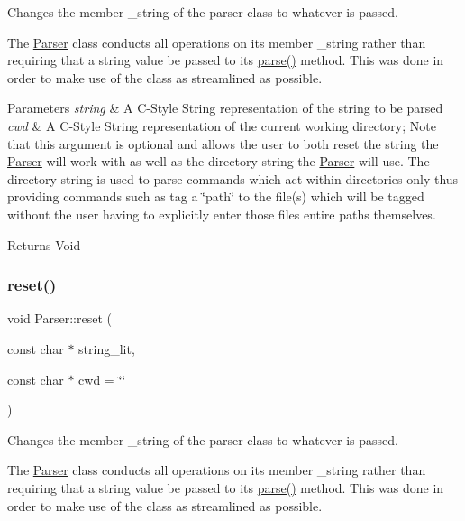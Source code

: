 Changes the member \+\_\+string of the parser class to whatever is passed. 

The \mbox{\hyperlink{class_parser}{Parser}} class conducts all operations on its member \+\_\+string rather than requiring that a string value be passed to its \mbox{\hyperlink{class_parser_a5b531e9ed867eeb8ccb9cb088cf35c24}{parse()}} method. This was done in order to make use of the class as streamlined as possible.


\begin{DoxyParams}{Parameters}
{\em string} & A C-\/\+Style String representation of the string to be parsed\\
\hline
{\em cwd} & A C-\/\+Style String representation of the current working directory; Note that this argument is optional and allows the user to both reset the string the \mbox{\hyperlink{class_parser}{Parser}} will work with as well as the directory string the \mbox{\hyperlink{class_parser}{Parser}} will use. The directory string is used to parse commands which act within directories only thus providing commands such as \textquotesingle{}tag\textquotesingle{} a \char`\"{}path\char`\"{} to the file(s) which will be tagged without the user having to explicitly enter those file\textquotesingle{}s entire paths themselves.\\
\hline
\end{DoxyParams}
\begin{DoxyReturn}{Returns}
Void 
\end{DoxyReturn}
\mbox{\label{class_parser_ab51b81b1617f1948205d73804e3c0fb9}} 
\subsubsection{\texorpdfstring{reset()}{reset()}\hspace{0.1cm}{\footnotesize\ttfamily [3/3]}}
{\footnotesize\ttfamily void Parser\+::reset (\begin{DoxyParamCaption}\item[{const char $\ast$}]{string\+\_\+lit,  }\item[{const char $\ast$}]{cwd = {\ttfamily \char`\"{}\char`\"{}} }\end{DoxyParamCaption})}



Changes the member \+\_\+string of the parser class to whatever is passed. 

The \mbox{\hyperlink{class_parser}{Parser}} class conducts all operations on its member \+\_\+string rather than requiring that a string value be passed to its \mbox{\hyperlink{class_parser_a5b531e9ed867eeb8ccb9cb088cf35c24}{parse()}} method. This was done in order to make use of the class as streamlined as possible.


